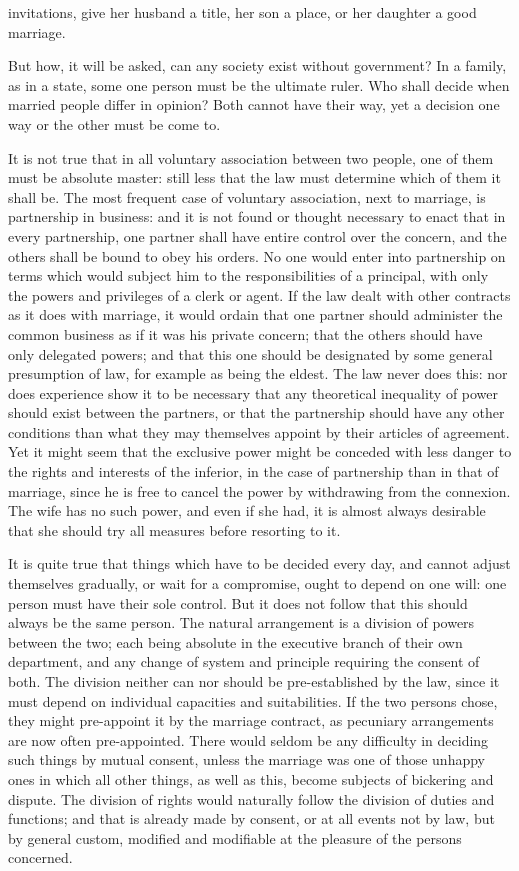 \documentclass[12pt]{report}
\begin{document}
invitations, give her husband a title, her son a place, or her daughter a good marriage.

But how, it will be asked, can any society exist without government? In a family, as in a state, some one person must be the ultimate ruler. Who shall decide when married people differ in opinion? Both cannot have their way, yet a decision one way or the other must be come to.

It is not true that in all voluntary association between two people, one of them must be absolute master: still less that the law must determine which of them it shall be. The most frequent case of voluntary association, next to marriage, is partnership in business: and it is not found or thought necessary to enact that in every partnership, one partner shall have entire control over the concern, and the others shall be bound to obey his orders. No one would enter into partnership on terms which would subject him to the responsibilities of a principal, with only the powers and privileges of a clerk or agent. If the law dealt with other contracts as it does with marriage, it would ordain that one partner should administer the common business as if it was his private concern; that the others should have only delegated powers; and that this one should be designated by some general presumption of law, for example as being the eldest. The law never does this: nor does experience show it to be necessary that any theoretical inequality of power should exist between the partners, or that the partnership should have any other conditions than what they may themselves appoint by their articles of agreement. Yet it might seem that the exclusive power might be conceded with less danger to the rights and interests of the inferior, in the case of partnership than in that of marriage, since he is free to cancel the power by withdrawing from the connexion. The wife has no such power, and even if she had, it is almost always desirable that she should try all measures before resorting to it.

It is quite true that things which have to be decided every day, and cannot adjust themselves gradually, or wait for a compromise, ought to depend on one will: one person must have their sole control. But it does not follow that this should always be the same person. The natural arrangement is a division of powers between the two; each being absolute in the executive branch of their own department, and any change of system and principle requiring the consent of both. The division neither can nor should be pre-established by the law, since it must depend on individual capacities and suitabilities. If the two persons chose, they might pre-appoint it by the marriage contract, as pecuniary arrangements are now often pre-appointed. There would seldom be any difficulty in deciding such things by mutual consent, unless the marriage was one of those unhappy ones in which all other things, as well as this, become subjects of bickering and dispute. The division of rights would naturally follow the division of duties and functions; and that is already made by consent, or at all events not by law, but by general custom, modified and modifiable at the pleasure of the persons concerned.
\end{document}
